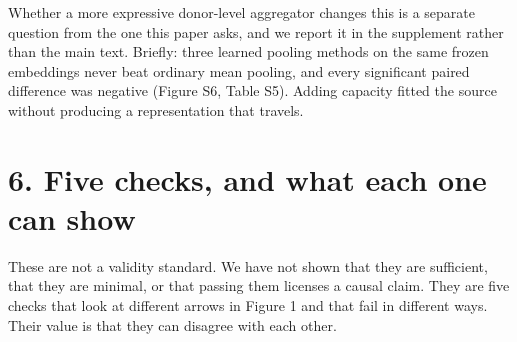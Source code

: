 Whether a more expressive donor-level aggregator changes this is a separate question from the one this paper asks, and we report it in the supplement rather than the main text. Briefly: three learned pooling methods on the same frozen embeddings never beat ordinary mean pooling, and every significant paired difference was negative (Figure S6, Table S5). Adding capacity fitted the source without producing a representation that travels.

\section{6. Five checks, and what each one can show}\label{five-checks-and-what-each-one-can-show}

These are not a validity standard. We have not shown that they are sufficient, that they are minimal, or that passing them licenses a causal claim. They are five checks that look at different arrows in Figure 1 and that fail in different ways. Their value is that they can disagree with each other.

